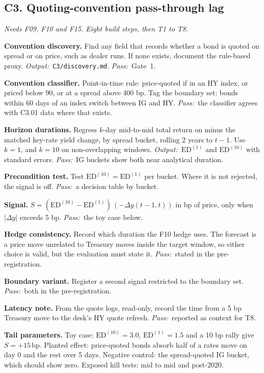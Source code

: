 \documentclass[11pt,letterpaper]{article}
\makeatletter
\newcommand{\code}[1]{\texttt{#1}}
\newcommand{\bp}{\,\mathrm{bp}}
\newcommand*{\twodigit}[1]{\expandafter\@twodigit\csname c@#1\endcsname}
\newcommand*{\@twodigit}[1]{\ifnum#1<10 0\fi\number#1}
\newcommand{\stepname}[1]{\textbf{#1.}}
\newcommand{\Out}{\textit{Output:}~}
\newcommand{\Pass}{\textit{Pass:}~}
\makeatother
\begin{document}
\subsection{C3. Quoting-convention pass-through lag}
\emph{Needs F09, F10 and F15. Eight build steps, then T1 to T8.}
\begin{ladder}[label=\textbf{C3.\twodigit*}]
\item \stepname{Convention discovery} Find any field that records whether a bond is quoted on spread or on price, such as dealer runs. If none exists, document the rule-based proxy. \Out \code{C3/discovery.md}. \Pass Gate~1.
\item \stepname{Convention classifier} Point-in-time rule: price-quoted if in an HY index, or priced below 90, or at a spread above 400 bp. Tag the boundary set: bonds within 60 days of an index switch between IG and HY. \Pass the classifier agrees with C3.01 data where that exists.
\item \stepname{Horizon durations} Regress $k$-day mid-to-mid total return on minus the matched key-rate yield change, by spread bucket, rolling 2 years to $t-1$. Use $k=1$, and $k=10$ on non-overlapping windows. \Out $\mathrm{ED}^{(1)}$ and $\mathrm{ED}^{(10)}$ with standard errors. \Pass IG buckets show both near analytical duration.
\item \stepname{Precondition test} Test $\mathrm{ED}^{(10)}=\mathrm{ED}^{(1)}$ per bucket. Where it is not rejected, the signal is off. \Pass a decision table by bucket.
\item \stepname{Signal} $S=(\mathrm{ED}^{(10)}-\mathrm{ED}^{(1)})\,(-\Delta y(t-1,t))$ in bp of price, only when $|\Delta y|$ exceeds 5 bp. \Pass the toy case below.
\item \stepname{Hedge consistency} Record which duration the F10 hedge uses. The forecast is a price move unrelated to Treasury moves inside the target window, so either choice is valid, but the evaluation must state it. \Pass stated in the pre-registration.
\item \stepname{Boundary variant} Register a second signal restricted to the boundary set. \Pass both in the pre-registration.
\item \stepname{Latency note} From the quote logs, read-only, record the time from a 5 bp Treasury move to the desk's HY quote refresh. \Pass reported as context for T8.
\end{ladder}
\textbf{Tail parameters.} Toy case: $\mathrm{ED}^{(10)}=3.0$, $\mathrm{ED}^{(1)}=1.5$ and a 10 bp rally give $S=+15\bp$. Planted effect: price-quoted bonds absorb half of a rates move on day 0 and the rest over 5 days. Negative control: the spread-quoted IG bucket, which should show zero. Exposed kill tests: mid to mid and post-2020.
\end{document}

